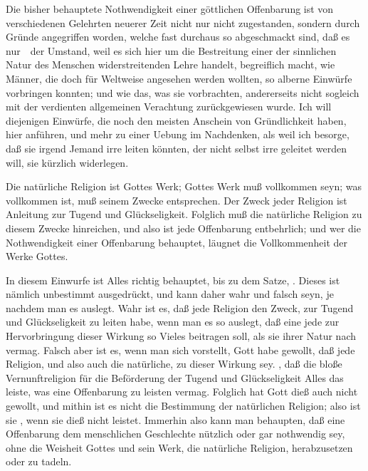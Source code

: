 Die bisher behauptete Nothwendigkeit einer göttlichen Offenbarung ist von verschiedenen Gelehrten neuerer Zeit nicht nur nicht zugestanden, sondern durch Gründe angegriffen worden, welche fast durchaus so abgeschmackt sind, daß es nur~\ der Umstand, weil es sich hier um die Bestreitung einer der sinnlichen Natur des Menschen widerstreitenden Lehre handelt, begreiflich macht, wie Männer, die doch für Weltweise angesehen werden wollten, so alberne Einwürfe vorbringen konnten; und wie das, was sie vorbrachten, andererseits nicht sogleich mit der verdienten allgemeinen Verachtung zurückgewiesen wurde. Ich will diejenigen Einwürfe, die noch den meisten Anschein von Gründlichkeit haben, hier anführen, und mehr zu einer Uebung im Nachdenken, als weil ich besorge, daß sie irgend Jemand irre leiten könnten, der nicht selbst irre geleitet werden will, sie kürzlich widerlegen.\par
{} Die natürliche Religion ist Gottes Werk; Gottes Werk muß vollkommen seyn; was vollkommen ist, muß seinem Zwecke entsprechen. Der Zweck jeder Religion ist Anleitung zur Tugend und Glückseligkeit. Folglich muß die natürliche Religion zu diesem Zwecke hinreichen, und also ist jede Offenbarung entbehrlich; und wer die Nothwendigkeit einer Offenbarung behauptet, läugnet die Vollkommenheit der Werke Gottes.\par
{} In diesem Einwurfe ist Alles richtig behauptet, bis zu dem Satze, . Dieses ist nämlich unbestimmt ausgedrückt, und kann daher wahr und falsch seyn, je nachdem man es auslegt. Wahr ist es, daß jede Religion den Zweck, zur Tugend und Glückseligkeit zu leiten habe, wenn man es so auslegt, daß eine jede zur Hervorbringung dieser Wirkung so Vieles beitragen soll, als sie ihrer Natur nach vermag. Falsch aber ist es, wenn man sich vorstellt, Gott habe gewollt, daß jede Religion, und also auch die natürliche,  zu dieser Wirkung sey. , daß die bloße Vernunftreligion für die Beförderung der Tugend und Glückseligkeit Alles das leiste, was eine Offenbarung zu leisten vermag. Folglich hat Gott dieß auch nicht gewollt, und mithin ist es nicht die Bestimmung der natürlichen Religion; also ist sie , wenn sie dieß nicht leistet. Immerhin also kann man behaupten, daß eine Offenbarung dem menschlichen Geschlechte nützlich oder gar nothwendig sey, ohne die Weisheit Gottes und sein Werk, die natürliche Religion, herabzusetzen oder zu tadeln.

